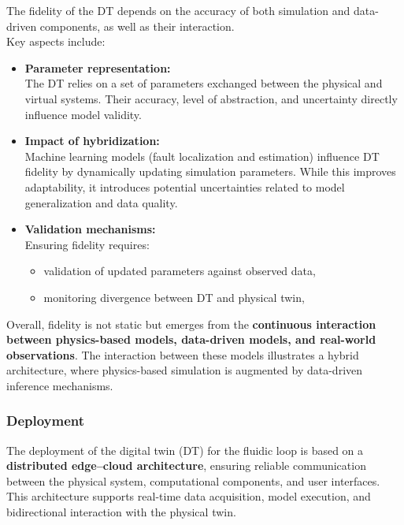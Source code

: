 \documentclass[
]{article}
\providecommand{\tightlist}{%
  \setlength{\itemsep}{0pt}\setlength{\parskip}{0pt}}
\begin{document}
The fidelity of the DT depends on the accuracy of both simulation and
data-driven components, as well as their interaction.\\
Key aspects include:

\begin{itemize}
\tightlist
\item
  \textbf{Parameter representation:}\\
  The DT relies on a set of parameters exchanged between the physical
  and virtual systems. Their accuracy, level of abstraction, and
  uncertainty directly influence model validity.
\item
  \textbf{Impact of hybridization:}\\
  Machine learning models (fault localization and estimation) influence
  DT fidelity by dynamically updating simulation parameters. While this
  improves adaptability, it introduces potential uncertainties related
  to model generalization and data quality.
\item
  \textbf{Validation mechanisms:}\\
  Ensuring fidelity requires:

  \begin{itemize}
  \tightlist
  \item
    validation of updated parameters against observed data,
  \item
    monitoring divergence between DT and physical twin,
  \end{itemize}
\end{itemize}

Overall, fidelity is not static but emerges from the \textbf{continuous
interaction between physics-based models, data-driven models, and
real-world observations}. The interaction between these models
illustrates a hybrid architecture, where physics-based simulation is
augmented by data-driven inference mechanisms.\\

\subsubsection{Deployment}\label{deployment}

The deployment of the digital twin (DT) for the fluidic loop is based on
a \textbf{distributed edge--cloud architecture}, ensuring reliable
communication between the physical system, computational components, and
user interfaces. This architecture supports real-time data acquisition,
model execution, and bidirectional interaction with the physical twin.
\end{document}
